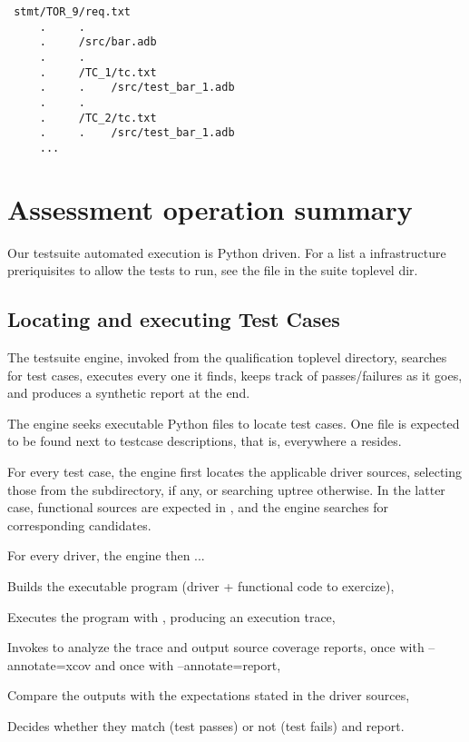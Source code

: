 \documentclass {report}
\begin{document}
\begin{verbatim}
 stmt/TOR_9/req.txt 
     .     .
     .     /src/bar.adb
     .     .
     .     /TC_1/tc.txt
     .     .    /src/test_bar_1.adb
     .     .
     .     /TC_2/tc.txt
     .     .    /src/test_bar_1.adb
     ...
\end{verbatim}


\section{Assessment operation summary}
\label{sec:assessment}

Our testsuite automated execution is Python driven.
%
For a list a infrastructure preriquisites to allow the tests to run, see the
 file in the suite toplevel dir.

\subsection{Locating and executing Test Cases}

The testsuite engine, invoked from the qualification toplevel directory,
searches for test cases, executes every one it finds, keeps track of
passes/failures as it goes, and produces a synthetic report at the end.

The engine seeks executable  Python files to locate test cases.
%
One  file is expected to be found next to testcase descriptions,
that is, everywhere a  resides.

For every test case, the engine first locates the applicable driver sources,
selecting those from the  subdirectory, if any, or searching uptree
otherwise.
%
In the latter case, functional sources are expected in , and
the engine searches for corresponding  candidates.

For every  driver, the engine then ...

\begin{Itemize}  
\item%
  Builds the executable program (driver + functional code to exercize),

\item%
  Executes the program with , producing an execution trace,

\item%
  Invokes  to analyze the trace and output source coverage
  reports, once with --annotate=xcov and once with --annotate=report,

\item%
  Compare the outputs with the expectations stated in the driver sources,

\item%
  Decides whether they match (test passes) or not (test fails) and report.
\end{Itemize}  
\end{document}
